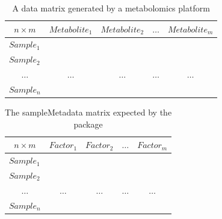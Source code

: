 \documentclass[ENG, BIB]{TFUOC}%
\begin{document}
\begin{table}[htbp]
    \centering
    \caption{A data matrix generated by a metabolomics platform}
    \label{tab:dataMatrix-example}
    \begin{tabular}{@{}lllll@{}}
        \toprule
        \multicolumn{1}{c}{$n \times m$} & \multicolumn{1}{c}{$Metabolite_1$} & \multicolumn{1}{c}{$Metabolite_2$} & \multicolumn{1}{c}{$\dots$} & \multicolumn{1}{c}{$Metabolite_m$} \\ \midrule
        $Sample_1$                       &                                    &                                    &                             &                                    \\
        $Sample_2$                       &                                    &                                    &                             &                                    \\
        \multicolumn{1}{c}{$\dots$}      & \multicolumn{1}{c}{$\dots$}        & \multicolumn{1}{c}{$\dots$}        & \multicolumn{1}{c}{$\dots$} & \multicolumn{1}{c}{$\dots$}        \\
        $Sample_n$                       &                                    &                                    &                             &                                    \\ \bottomrule
    \end{tabular}
\end{table}
\begin{table}[htbp]
    \centering
    \caption{The sampleMetadata matrix expected by the package}
    \label{tab:sampleMetadata-example}
    \begin{tabular}{@{}lllll@{}}
        \toprule
        \multicolumn{1}{c}{$n \times m$} & \multicolumn{1}{c}{$Factor_1$} & \multicolumn{1}{c}{$Factor_2$} & \multicolumn{1}{c}{$\dots$} & \multicolumn{1}{c}{$Factor_m$} \\ \midrule
        $Sample_1$                       &                                &                                &                             &                                \\
        $Sample_2$                       &                                &                                &                             &                                \\
        \multicolumn{1}{c}{$\dots$}      & \multicolumn{1}{c}{$\dots$}    & \multicolumn{1}{c}{$\dots$}    & \multicolumn{1}{c}{$\dots$} & \multicolumn{1}{c}{$\dots$}    \\
        $Sample_n$                       &                                &                                &                             &                                \\ \bottomrule
    \end{tabular}
\end{table}
\end{document}
